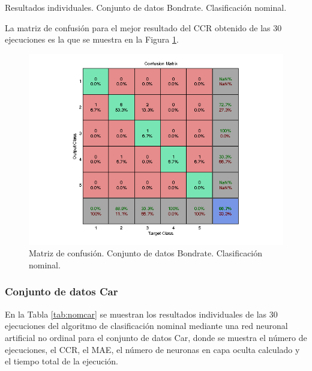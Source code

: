 			\begin{table}[!htbp]
				\centering
				\caption{Resultados individuales. Conjunto de datos Bondrate. Clasificación nominal.}
				\label{tab:nombon}
			\end{table}
			
			La matriz de confusión para el mejor resultado del CCR obtenido de las 30 ejecuciones es la que se muestra en la Figura \ref{fig:nombon}.
			
			\begin{figure}[htbp]
				\centering
				\includegraphics[scale=0.8]{../src/results/nominal/bondrate_mc1.png}
				\caption{Matriz de confusión. Conjunto de datos Bondrate. Clasificación nominal.}
				\label{fig:nombon}
			\end{figure}

			\subsubsection{Conjunto de datos Car}
			
			En la Tabla \ref{tab:nomcar} se muestran los resultados individuales de las 30 ejecuciones del algoritmo de clasificación nominal mediante una red neuronal artificial no ordinal para el conjunto de datos Car, donde se muestra el número de ejecuciones, el CCR, el MAE, el número de neuronas en capa oculta calculado y el tiempo total de la ejecución.\\
			
